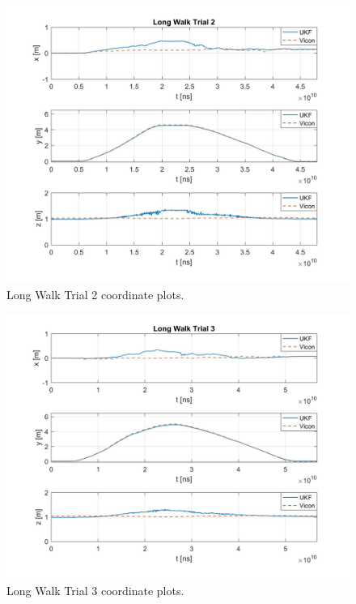 \begin{figure}
  \centering
    \includegraphics[width=\textwidth]{longWalk2_xyz}
  \caption[Long Walk Trial 2]{Long Walk Trial 2 coordinate plots.}
  \label{fig:longWalk2_xyz}
\end{figure}

\begin{figure}
  \centering
    \includegraphics[width=\textwidth]{longWalk3_xyz}
  \caption[Long Walk Trial 3]{Long Walk Trial 3 coordinate plots.}
  \label{fig:longWalk3_xyz}
\end{figure}

